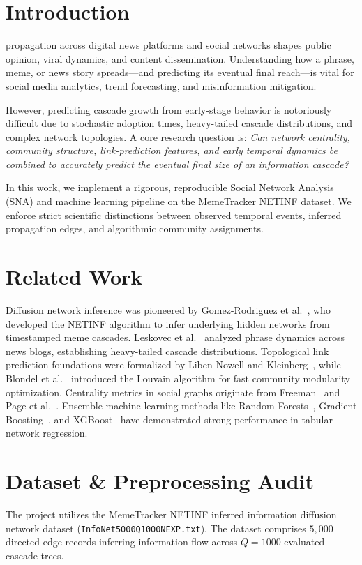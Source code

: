 \documentclass[10pt,journal,compsoc]{IEEEtran}
\begin{document}
\section{Introduction}
 propagation across digital news platforms and social networks shapes public opinion, viral dynamics, and content dissemination. Understanding how a phrase, meme, or news story spreads—and predicting its eventual final reach—is vital for social media analytics, trend forecasting, and misinformation mitigation.

However, predicting cascade growth from early-stage behavior is notoriously difficult due to stochastic adoption times, heavy-tailed cascade distributions, and complex network topologies. A core research question is: \textit{Can network centrality, community structure, link-prediction features, and early temporal dynamics be combined to accurately predict the eventual final size of an information cascade?}

In this work, we implement a rigorous, reproducible Social Network Analysis (SNA) and machine learning pipeline on the MemeTracker NETINF dataset. We enforce strict scientific distinctions between observed temporal events, inferred propagation edges, and algorithmic community assignments.

\section{Related Work}
Diffusion network inference was pioneered by Gomez-Rodriguez et al.~\cite{gomez2010inferring}, who developed the NETINF algorithm to infer underlying hidden networks from timestamped meme cascades. Leskovec et al.~\cite{leskovec2009meme} analyzed phrase dynamics across news blogs, establishing heavy-tailed cascade distributions. Topological link prediction foundations were formalized by Liben-Nowell and Kleinberg~\cite{liben2007link}, while Blondel et al.~\cite{blondel2008fast} introduced the Louvain algorithm for fast community modularity optimization. Centrality metrics in social graphs originate from Freeman~\cite{freeman1978centrality} and Page et al.~\cite{page1999pagerank}. Ensemble machine learning methods like Random Forests~\cite{breiman2001random}, Gradient Boosting~\cite{friedman2001greedy}, and XGBoost~\cite{chen2016xgboost} have demonstrated strong performance in tabular network regression.

\section{Dataset \& Preprocessing Audit}
The project utilizes the MemeTracker NETINF inferred information diffusion network dataset (\texttt{InfoNet5000Q1000NEXP.txt}). The dataset comprises $5,000$ directed edge records inferring information flow across $Q=1000$ evaluated cascade trees.
\end{document}
